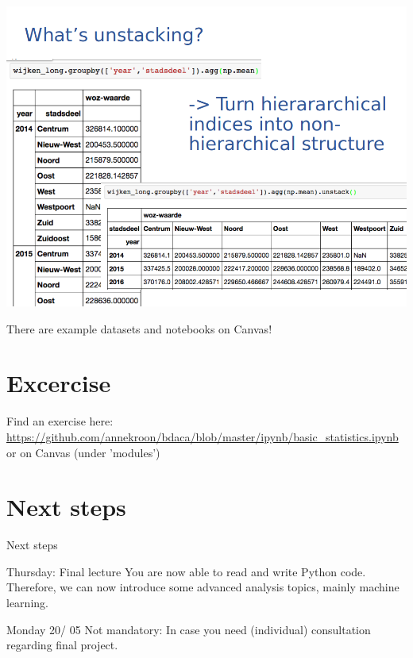 \documentclass{beamer}
\begin{document}
{\begin{frame}[plain]
{	\includegraphics[width=\paperwidth,height=\paperheight,keepaspectratio]{../../pictures/pandas-example5.png}}
\end{frame}
}


\begin{frame}
There are example datasets and notebooks on Canvas!
\end{frame}

\section{Excercise}
\begin{frame}{}
Find an exercise here: \url{https://github.com/annekroon/bdaca/blob/master/ipynb/basic_statistics.ipynb}
or on Canvas (under 'modules')
\end{frame}




\section{Next steps}
\begin{frame}{Next steps}
\begin{block}{Thursday: Final lecture}
You are now able to read and write Python code. Therefore, we can now introduce some advanced analysis topics, mainly machine learning.
\end{block}

\begin{block}{Monday 20/ 05 }
Not mandatory: In case you need (individual) consultation regarding final project.
\end{block}
\end{frame}
\end{document}

